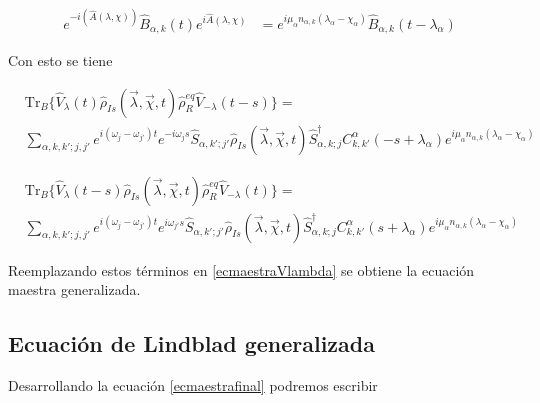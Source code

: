 \begin{appendixs}
\begin{align*}
    e^{-i(\hat{A}(\lambda,\chi))} \hat{B}_{\alpha,k}(t)e^{i\hat{A}(\lambda,\chi)} & = e^{i\mu_{\alpha}n_{\alpha,k}(\lambda_{\alpha}-\chi_{\alpha})} \hat{B}_{\alpha,k}(t-\lambda_{\alpha}) 
\end{align*}

Con esto se tiene

\begin{align*}
 & \text{Tr}_{B}\{ \hat{V}_{\lambda}(t)\hat{\rho}_{Is}(\vec{\lambda},\vec{\chi},t)\hat{\rho}_{R}^{eq}\hat{V}_{-\lambda}(t-s) \} = \\
 & \sum_{\alpha,k,k';j,j'}e^{i(\omega_{j}-\omega_{j'})t}e^{-i\omega_{j}s}\hat{S}_{\alpha,k';j'}\hat{\rho}_{Is}(\vec{\lambda},\vec{\chi},t)\hat{S}^{\dagger}_{\alpha,k;j} C^{\alpha}_{k,k'}(-s+\lambda_{\alpha})e^{i\mu_{\alpha}n_{\alpha,k}(\lambda_{\alpha}-\chi_{\alpha})}
 \end{align*}

 \begin{align*}
    & \text{Tr}_{B}\{ \hat{V}_{\lambda}(t-s)\hat{\rho}_{Is}(\vec{\lambda},\vec{\chi},t)\hat{\rho}_{R}^{eq}\hat{V}_{-\lambda}(t) \} = \\
    & \sum_{\alpha,k,k';j,j'}e^{i(\omega_{j}-\omega_{j'})t}e^{i\omega_{j'}s}\hat{S}_{\alpha,k';j'}\hat{\rho}_{Is}(\vec{\lambda},\vec{\chi},t)\hat{S}^{\dagger}_{\alpha,k;j} C^{\alpha}_{k,k'}(s+\lambda_{\alpha})e^{i\mu_{\alpha}n_{\alpha,k}(\lambda_{\alpha}-\chi_{\alpha})}
    \end{align*}
   
Reemplazando estos términos en \ref{ecmaestraVlambda} se obtiene la ecuación maestra generalizada.   

\label{finalequation}

\newpage

\subsection{Ecuación de Lindblad generalizada}
Desarrollando la ecuación \ref{ecmaestrafinal} podremos escribir


\end{appendixs}
